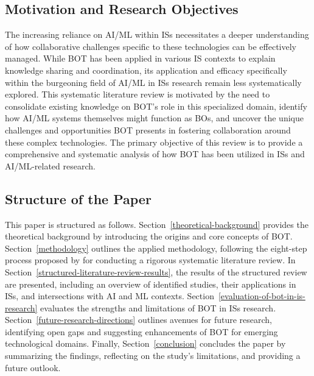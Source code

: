 \documentclass[12pt,oneside]{article}
\begin{document}
\subsection{Motivation and Research Objectives} \label{motivation-and-research-objectives}

The increasing reliance on \ac{AI}/\ac{ML} within \ac{IS}s necessitates a deeper understanding of how collaborative challenges specific to these technologies can be effectively managed. While \ac{BOT} has been applied in various \ac{IS} contexts to explain knowledge sharing and coordination, its application and efficacy specifically within the burgeoning field of \ac{AI}/\ac{ML} in \ac{IS}s research remain less systematically explored. \newline
This systematic literature review is motivated by the need to consolidate existing knowledge on \ac{BOT}'s role in this specialized domain, identify how \ac{AI}/\ac{ML} systems themselves might function as \ac{BO}s, and uncover the unique challenges and opportunities BOT presents in fostering collaboration around these complex technologies. \newline
The primary objective of this review is to provide a comprehensive and systematic analysis of how BOT has been utilized in \ac{IS}s and \ac{AI}/\ac{ML}-related research. 

\subsection{Structure of the Paper} \label{structure-of-the-paper}

This paper is structured as follows. Section~\ref{theoretical-background} provides the theoretical background by introducing the origins and core concepts of \ac{BOT}. Section~\ref{methodology} outlines the applied methodology, following the eight-step process proposed by \citet[43-44]{okoli2015guide} for conducting a rigorous systematic literature review. In Section~\ref{structured-literature-review-results}, the results of the structured review are presented, including an overview of identified studies, their applications in \ac{IS}s, and intersections with \ac{AI} and \ac{ML} contexts. Section~\ref{evaluation-of-bot-in-is-research} evaluates the strengths and limitations of \ac{BOT} in \ac{IS}s research. Section~\ref{future-research-directions} outlines avenues for future research, identifying open gaps and suggesting enhancements of \ac{BOT} for emerging technological domains. Finally, Section~\ref{conclusion} concludes the paper by summarizing the findings, reflecting on the study’s limitations, and providing a future outlook.
\end{document}
